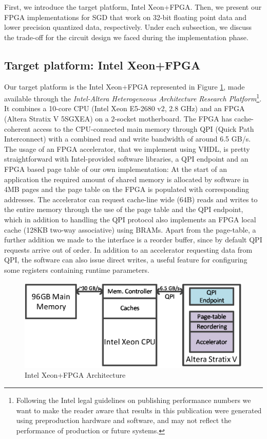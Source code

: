 \documentclass{article}
\begin{document}
First, we introduce the target platform, Intel Xeon+FPGA. Then, we present our FPGA implementations for SGD that work on 32-bit floating point data and lower precision quantized data, respectively. Under each subsection, we discuss the trade-off for the circuit design we faced during the implementation phase.

\subsection{Target platform: Intel Xeon+FPGA}
\label{section:xeonfpga}

Our target platform is the Intel Xeon+FPGA represented in Figure \ref{fig:xeonfpga}, made available through the \textit{Intel-Altera Heterogeneous Architecture Research Platform}\footnote{Following the Intel legal guidelines on publishing performance numbers we want to make the reader aware that results in this publication were generated using preproduction hardware and software, and may not reflect the performance of production or future systems.}. It combines a 10-core CPU (Intel Xeon E5-2680 v2, 2.8 GHz) and an FPGA (Altera Stratix V 5SGXEA) on a 2-socket motherboard. The FPGA has cache-coherent access to the CPU-connected main memory through QPI (Quick Path Interconnect) with a combined read and write bandwidth of around 6.5 GB/s. The usage of an FPGA accelerator, that we implement using VHDL, is pretty straightforward with Intel-provided software libraries, a QPI endpoint and an FPGA based page table of our own implementation: At the start of an application the required amount of shared memory is allocated by software in 4MB pages and the page table on the FPGA is populated with corresponding addresses. The accelerator can request cache-line wide (64B) reads and writes to the entire memory through the use of the page table and the QPI endpoint, which in addition to handling the QPI protocol also implements an FPGA local cache (128KB two-way associative) using BRAMs. Apart from the page-table, a further addition we made to the interface is a reorder buffer, since by default QPI requests arrive out of order. In addition to an accelerator requesting data from QPI, the software can also issue direct writes, a useful feature for configuring some registers containing runtime parameters.

\begin{figure}[t]
\centering
\includegraphics[width=.7\columnwidth]{Figures/XeonFPGA.eps}
\caption{Intel Xeon+FPGA Architecture}
\label{fig:xeonfpga}
\end{figure}
\end{document}
